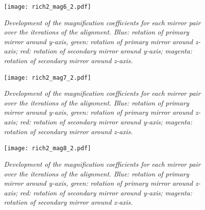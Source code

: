 \begin{figure}[!ht]
	\vspace*{-0.cm}
	\begin{center}
		\texttt{[image: rich2\_mag6\_2.pdf]}
		\vspace*{-1.5cm}
	\end{center}
	\caption{\textit{Development of the magnification coefficients for each mirror pair over the iterations of the alignment. Blue: rotation of primary mirror around y-axis, green: rotation of primary mirror around z-axis; red: rotation of secondary mirror around y-axis; magenta: rotation of secondary mirror around z-axis.}}
	\label{fig:rich2mag6_2}
\end{figure}
\begin{figure}[!ht]
	\vspace*{-0.cm}
	\begin{center}
		\texttt{[image: rich2\_mag7\_2.pdf]}
		\vspace*{-1.5cm}
	\end{center}
	\caption{\textit{Development of the magnification coefficients for each mirror pair over the iterations of the alignment. Blue: rotation of primary mirror around y-axis, green: rotation of primary mirror around z-axis; red: rotation of secondary mirror around y-axis; magenta: rotation of secondary mirror around z-axis.}}
	\label{fig:rich2mag7_2}
\end{figure}
\begin{figure}[!ht]
	\vspace*{-0.cm}
	\begin{center}
		\texttt{[image: rich2\_mag8\_2.pdf]}
		\vspace*{-1.5cm}
	\end{center}
	\caption{\textit{Development of the magnification coefficients for each mirror pair over the iterations of the alignment. Blue: rotation of primary mirror around y-axis, green: rotation of primary mirror around z-axis; red: rotation of secondary mirror around y-axis; magenta: rotation of secondary mirror around z-axis.}}
	\label{fig:rich2mag8_2}
\end{figure}
